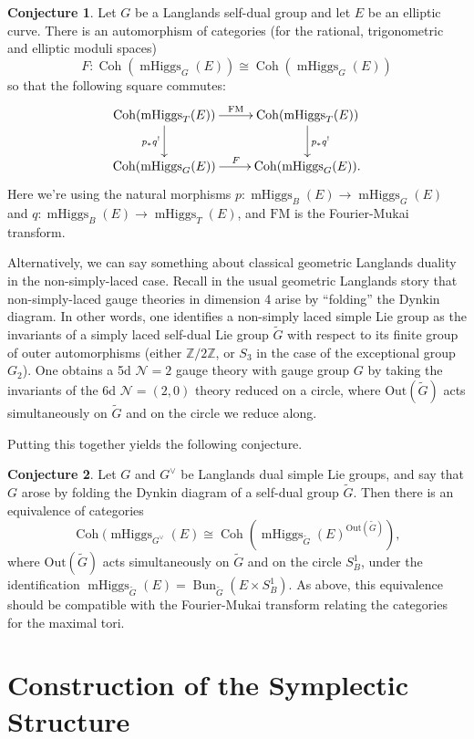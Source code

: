 \documentclass[11pt, oneside, reqno]{amsart}
\theoremstyle{definition} \newtheorem{definition}{Definition}[section]
\newtheorem{conjecture}[definition]{Conjecture}
\theoremstyle{definition} \newtheorem{remark}[definition]{Remark}
\theoremstyle{definition} \newtheorem{remarks}[definition]{Remarks}
\theoremstyle{definition} \newtheorem{question}[definition]{Question}
\theoremstyle{definition} \newtheorem*{note}{Note}
\theoremstyle{definition} \newtheorem{example}[definition]{Example}
\theoremstyle{definition} \newtheorem{examples}[definition]{Examples}
\newcommand{\mr}[1]{\mathrm{#1}}
\newcommand{\mc}[1]{\mathcal{#1}}
\newcommand{\wt}[1]{\widetilde{#1}}
\newcommand{\ZZ}{\mathbb{Z}}
\newcommand{\iso}{\cong}
\DeclareMathOperator{\coh}{Coh}
\DeclareMathOperator{\bun}{Bun}
\DeclareMathOperator{\mhiggs}{mHiggs}
\begin{document}
\begin{conjecture}
Let $G$ be a Langlands self-dual group and let $E$ be an elliptic curve.  There is an automorphism of categories (for the rational, trigonometric and elliptic moduli spaces)
\[F \colon \coh(\mhiggs_G(E)) \iso \coh(\mhiggs_{G}(E))\]
so that the following square commutes:
\[\xymatrix{
\coh(\mhiggs_T(E)) \ar[r]^{\mathrm{FM}} \ar[d]_{p_*q^!} &\coh(\mhiggs_T(E)) \ar[d]^{p_*q^!} \\
\coh(\mhiggs_G(E)) \ar[r]^{F} &\coh(\mhiggs_G(E)).
}\]
Here we're using the natural morphisms $p \colon \mhiggs_B(E) \to \mhiggs_G(E)$ and $q \colon \mhiggs_B(E) \to \mhiggs_T(E)$, and $\mr{FM}$ is the Fourier-Mukai transform.
\end{conjecture}

Alternatively, we can say something about classical geometric Langlands duality in the non-simply-laced case.  Recall in the usual geometric Langlands story that non-simply-laced gauge theories in dimension 4 arise by ``folding'' the Dynkin diagram.  In other words, one identifies a non-simply laced simple Lie group as the invariants of a simply laced self-dual Lie group $\wt G$ with respect to its finite group of outer automorphisms (either $\ZZ/2\ZZ$, or $S_3$ in the case of the exceptional group $G_2$).  One obtains a 5d $\mc N=2$ gauge theory with gauge group $G$ by taking the invariants of the 6d $\mc N=(2,0)$ theory reduced on a circle, where $\mr{Out}(\wt G)$ acts simultaneously on $\wt G$ and on the circle we reduce along.

Putting this together yields the following conjecture.
\begin{conjecture}
\label{eq:classical-q-langlands}
Let $G$ and $G^\vee$ be Langlands dual simple Lie groups, and say that $G$ arose by folding the Dynkin diagram of a self-dual group $\wt G$.  Then there is an equivalence of categories
\[\coh(\mhiggs_{G^\vee}(E) \iso \coh(\mhiggs_{\wt G}(E)^{\mr{Out}(\wt G)}),\]
where $\mr{Out}(\wt G)$ acts simultaneously on $\wt G$ and on the circle $S^1_B$, under the identification $\mhiggs_{\wt G}(E) = \bun_{\wt G}(E \times S^1_B)$.  As above, this equivalence should be compatible with the Fourier-Mukai transform relating the categories for the maximal tori.
\end{conjecture}

\section{Construction of the Symplectic Structure} \label{symp_section}
\end{document}
